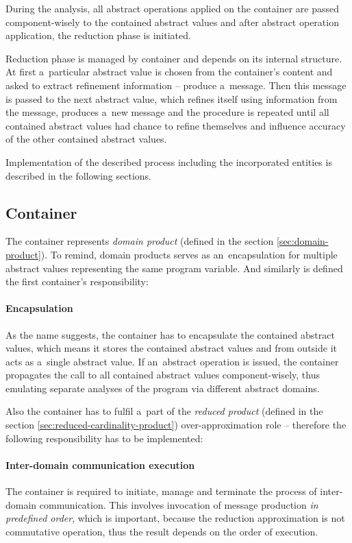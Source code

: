 \documentclass[12pt,oneside]{fithesis2}
\theoremstyle{definition}
\begin{document}
During the analysis, all abstract operations applied on the container are passed component-wisely to the contained abstract values and after abstract operation application, the reduction phase is initiated.

Reduction phase is managed by container and depends on its internal structure. At first a~particular abstract value is chosen from the container's content and asked to extract refinement information -- produce a~message. Then this message is passed to the next abstract value, which refines itself using information from the message, produces a~new message and the procedure is repeated until all contained abstract values had chance to refine themselves and influence accuracy of the other contained abstract values.

Implementation of the described process including the incorporated entities is described in the following sections.

\subsection{Container}

The container represents \textit{domain product} (defined in the section \ref{sec:domain-product}). To remind, domain products serves as an~encapsulation for multiple abstract values representing the same program variable. And similarly is defined the first container's responsibility:

\paragraph{Encapsulation}
As the name suggests, the container has to encapsulate the contained abstract values, which means it stores the contained abstract values and from outside it acts as a~single abstract value. If an~abstract operation is issued, the container propagates the call to all contained abstract values component-wisely, thus emulating separate analyses of the program via different abstract domains.

\vspace{1\baselineskip} %

Also the container has to fulfil a~part of the \textit{reduced product} (defined in the section \ref{sec:reduced-cardinality-product}) over-approximation role -- therefore the following responsibility has to be implemented:

\paragraph{Inter-domain communication execution}
The container is required to initiate, manage and terminate the process of inter-domain communication. This involves invocation of message production \textit{in predefined order}, which is important, because the reduction approximation is not commutative operation, thus the result depends on the order of execution.
\end{document}
